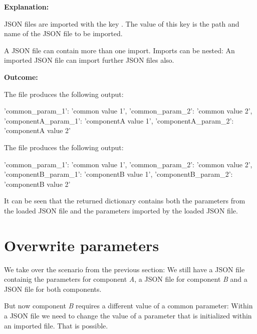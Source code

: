\textbf{Explanation:}

\vspace{2ex}

JSON files are imported with the key . The value of this key is the path and name of the JSON file to be imported.

A JSON file can contain more than one import. Imports can be nested: An imported JSON file can import further JSON files also.


\newpage

\textbf{Outcome:}

The file  produces the following output:

\begin{pythonlog}
{'common_param_1': 'common value 1',
 'common_param_2': 'common value 2',
 'componentA_param_1': 'componentA value 1',
 'componentA_param_2': 'componentA value 2'}
\end{pythonlog}

The file  produces the following output:

\begin{pythonlog}
{'common_param_1': 'common value 1',
 'common_param_2': 'common value 2',
 'componentB_param_1': 'componentB value 1',
 'componentB_param_2': 'componentB value 2'}
\end{pythonlog}

It can be seen that the returned dictionary contains both the parameters from the loaded JSON file and the parameters imported by the loaded JSON file.



\section{Overwrite parameters}\label{overwrite-parameters}

We take over the scenario from the previous section: We still have a JSON file  containig the parameters for
component \textit{A}, a JSON file  for component \textit{B} and a JSON file  for both components.

But now component \textit{B} requires a different value of a common parameter: Within a JSON file we need to change the value of a parameter
that is initialized within an imported file. That is possible.

